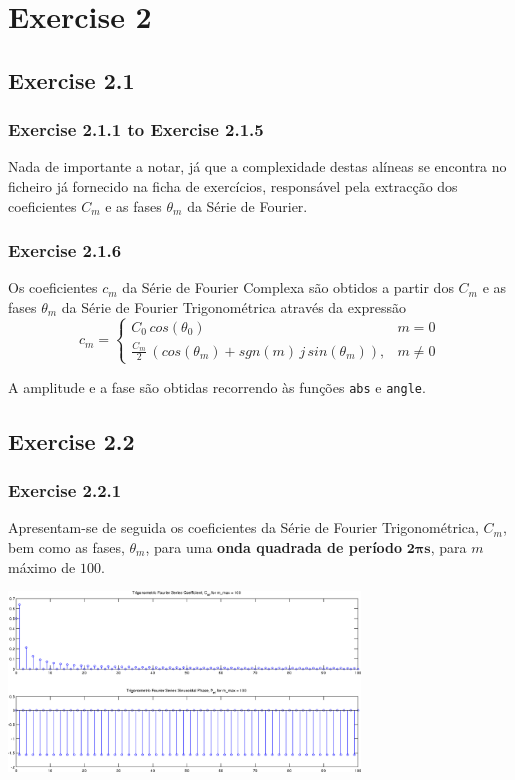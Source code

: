 \documentclass[a4paper]{article}
\begin{document}
\section{Exercise 2}
\subsection{Exercise 2.1}
\subsubsection{Exercise 2.1.1 to Exercise 2.1.5}
\noindent Nada de importante a notar, já que a complexidade destas alíneas se encontra no ficheiro já fornecido na ficha de exercícios, responsável pela extracção dos coeficientes $C_m$ e as fases $\theta_m$ da Série de Fourier.

\subsubsection{Exercise 2.1.6}
\noindent Os coeficientes $c_m$ da Série de Fourier Complexa são obtidos a partir dos $C_m$ e as fases $\theta_m$ da Série de Fourier Trigonométrica através da expressão
\begin{equation}
	c_m = \left\{
	\begin{array}{lr}
		C_0 \, cos(\theta_0) & m = 0 \\
		\frac{C_m}{2} \, (cos(\theta_m) + sgn(m) \, j \, sin(\theta_m)), & m \neq 0
	\end{array}
	\right.
\end{equation}

\noindent A amplitude e a fase são obtidas recorrendo às funções \texttt{abs} e \texttt{angle}.

\subsection{Exercise 2.2}
\subsubsection{Exercise 2.2.1}
\noindent Apresentam-se de seguida os coeficientes da Série de Fourier Trigonométrica, $C_m$, bem como as fases, $\theta_m$, para uma \textbf{onda quadrada de período} $\mathbf{2 \pi s}$, para $m$ máximo de $100$.

\begin{center}
	\includegraphics[width=0.70\textwidth]{images/ex2_2_1_cm_tm.png}
	\label{fig:ex2_2_1_cm_tm}
\end{center}
\end{document}
